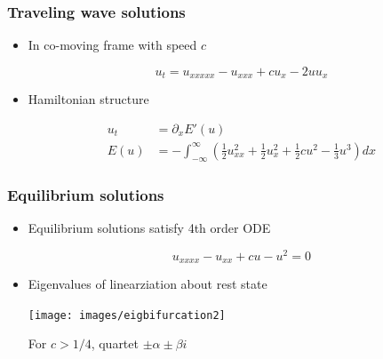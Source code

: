 \documentclass[16pt]{beamer}
\begin{document}
\begin{frame}
	\frametitle{Traveling wave solutions}
	\fontsize{16}{7.2}\selectfont
	\begin{itemize}
		\item In co-moving frame with speed $c$
		\begin{center}
		\[ u_t = u_{xxxxx} - u_{xxx} + c u_x - 2 u u_x \]
		\end{center}

		\item Hamiltonian structure
		\begin{center}
		\begin{align*} 
			u_t &= \partial_x E'(u) \\
			E(u) &= -\int_{-\infty}^{\infty} \left( \frac{1}{2}u_{xx}^2 + \frac{1}{2}u_x^2 + \frac{1}{2}cu^2 - \frac{1}{3}u^3 \right) dx 
		\end{align*}
		\end{center}
	\end{itemize}
\end{frame}


\begin{frame}
	\frametitle{Equilibrium solutions}
	\fontsize{16}{7.2}\selectfont
	\begin{itemize}
		\item Equilibrium solutions satisfy 4th order ODE
		\begin{center}
		\[u_{xxxx} - u_{xx} + cu - u^2 = 0\]
		\end{center}
		\vspace{0.25cm}
		\item Eigenvalues of linearziation about rest state
		\begin{center}
		\texttt{[image: images/eigbifurcation2]}
		\end{center}
		For $c > 1/4$, quartet $\pm \alpha \pm \beta i$
	\end{itemize}
\end{frame}
\end{document}
